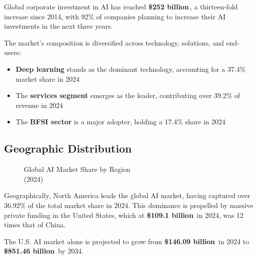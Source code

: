 \documentclass[11pt,a4paper]{report}
\newcommand{\marketvalue}[2]{\textcolor{trust}{\textbf{\$#1}}\,\textcolor{darkgray}{#2}}
\begin{document}
\begin{keypoint}
Global corporate investment in AI has reached \marketvalue{252 billion}{}, a thirteen-fold increase since 2014, with 92\% of companies planning to increase their AI investments in the next three years.
\end{keypoint}

The market's composition is diversified across technology, solutions, and end-users:

\begin{itemize}
    \item \textbf{Deep learning} stands as the dominant technology, accounting for a 37.4\% market share in 2024
    \item The \textbf{services segment} emerges as the leader, contributing over 39.2\% of revenue in 2024
    \item The \textbf{BFSI sector} is a major adopter, holding a 17.4\% share in 2024
\end{itemize}

\subsection{Geographic Distribution}
\begin{wrapfigure}{r}{0.5\textwidth}
\centering
{}
\caption{Global AI Market Share by Region\\(2024)}
\end{wrapfigure}

Geographically, North America leads the global AI market, having captured over 36.92\% of the total market share in 2024. This dominance is propelled by massive private funding in the United States, which at \marketvalue{109.1 billion}{} in 2024, was 12 times that of China. 

The U.S. AI market alone is projected to grow from \marketvalue{146.09 billion}{} in 2024 to \marketvalue{851.46 billion}{} by 2034.
\end{document}
